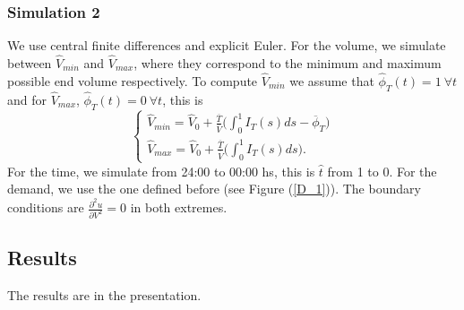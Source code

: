 \documentclass[12pt]{article}
\theoremstyle{definition}
\theoremstyle{remark}
\begin{document}
\subsubsection{Simulation 2}

We use central finite differences and explicit Euler. For the volume, we simulate between $\hat{V}_{min}$ and $\hat{V}_{max}$, where they correspond to the minimum and maximum possible end volume respectively. To compute $\hat{V}_{min}$ we assume that $\hat{\phi}_T(t)=1\ \forall t$ and for $\hat{V}_{max}$, $\hat{\phi}_T(t)=0\ \forall t$, this is
\begin{equation*}
\begin{cases}
\hat{V}_{min}=\hat{V}_0+\frac{\overline{T}}{\overline{V}}\big(\int_0^1I_T(s)ds-\overline{\phi}_T\big)\\
\hat{V}_{max}=\hat{V}_0+\frac{\overline{T}}{\overline{V}}\big(\int_0^1I_T(s)ds\big).
\end{cases}
\end{equation*}
For the time, we simulate from 24:00 to 00:00 hs, this is $\hat{t}$ from 1 to 0. For the demand, we use the one defined before (see Figure (\ref{D_1})). The boundary conditions are $\frac{\partial^2 u}{\partial V^2}=0$ in both extremes.

\subsection{Results}

The results are in the presentation.
\end{document}
